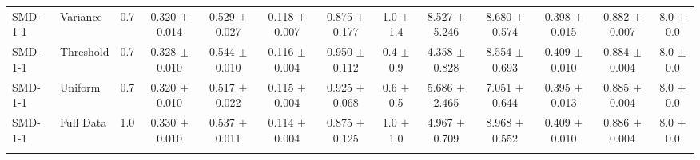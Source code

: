 \begin{table}[p]
{\begin{tabular}{@{}llccccccccccc@{}}
SMD-1-1 & Variance & 0.7 & 0.320 $\pm$ 0.014 & 0.529 $\pm$ 0.027 & 0.118 $\pm$ 0.007 & 0.875 $\pm$ 0.177 & 1.0 $\pm$ 1.4 & 8.527 $\pm$ 5.246 & 8.680 $\pm$ 0.574 & 0.398 $\pm$ 0.015 & 0.882 $\pm$ 0.007 & 8.0 $\pm$ 0.0 \\
SMD-1-1 & Threshold & 0.7 & 0.328 $\pm$ 0.010 & 0.544 $\pm$ 0.010 & 0.116 $\pm$ 0.004 & 0.950 $\pm$ 0.112 & 0.4 $\pm$ 0.9 & 4.358 $\pm$ 0.828 & 8.554 $\pm$ 0.693 & 0.409 $\pm$ 0.010 & 0.884 $\pm$ 0.004 & 8.0 $\pm$ 0.0 \\
SMD-1-1 & Uniform & 0.7 & 0.320 $\pm$ 0.010 & 0.517 $\pm$ 0.022 & 0.115 $\pm$ 0.004 & 0.925 $\pm$ 0.068 & 0.6 $\pm$ 0.5 & 5.686 $\pm$ 2.465 & 7.051 $\pm$ 0.644 & 0.395 $\pm$ 0.013 & 0.885 $\pm$ 0.004 & 8.0 $\pm$ 0.0 \\
SMD-1-1 & Full Data & 1.0 & 0.330 $\pm$ 0.010 & 0.537 $\pm$ 0.011 & 0.114 $\pm$ 0.004 & 0.875 $\pm$ 0.125 & 1.0 $\pm$ 1.0 & 4.967 $\pm$ 0.709 & 8.968 $\pm$ 0.552 & 0.409 $\pm$ 0.010 & 0.886 $\pm$ 0.004 & 8.0 $\pm$ 0.0 \\
\addlinespace
\bottomrule
\end{tabular}%
}
\label{supp-det-smd-method_retrained}
\end{table}
